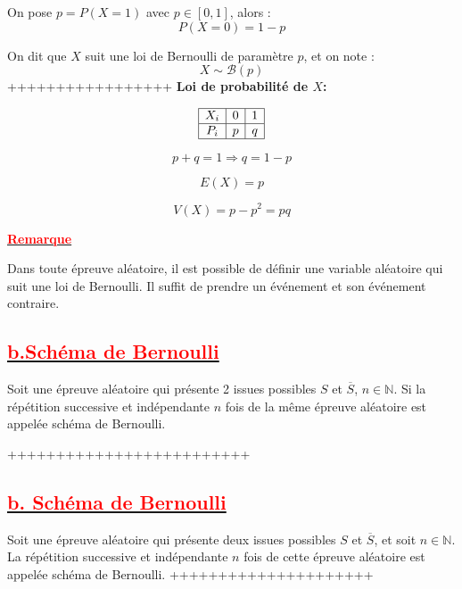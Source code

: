 \documentclass[12pt,a4paper]{article}
\begin{document}
On pose \(p = P(X = 1)\) avec \(p \in [0,1]\), alors :
\[
P(X = 0) = 1 - p
\]

On dit que \(X\) suit une loi de Bernoulli de paramètre \(p\), et on note :
\[
X \sim \mathcal{B}(p)
\]
+++++++++++++++++
\textbf{Loi de probabilité de \( X \):}

\[
\begin{array}{|c|c|c|}
\hline
X_i & 0 & 1 \\
\hline
P_i & p & q \\
\hline
\end{array}
\]

\[
p + q = 1 \Rightarrow q = 1 - p
\]

\[
E(X) = p
\]

\[
V(X) = p - p^2 = p q
\]

\underline{\textbf{\textcolor{red}{Remarque}}}

Dans toute épreuve aléatoire, il est possible de définir une variable aléatoire qui suit une loi de Bernoulli. Il suffit de prendre un événement et son événement contraire.

\subsection*{\underline{\textbf{\textcolor{red}{b.Schéma de Bernoulli}}}}

Soit une épreuve aléatoire qui présente 2 issues possibles \( S \) et \( \overline{S} \), \( n \in \mathbb{N} \). Si la répétition successive et indépendante \( n \) fois de la même épreuve aléatoire est appelée schéma de Bernoulli.

+++++++++++++++++++++++++
\subsection*{\underline{\textbf{\textcolor{red}{b. Schéma de Bernoulli}}}}

Soit une épreuve aléatoire qui présente deux issues possibles \( S \) et \( \overline{S} \), et soit \( n \in \mathbb{N} \). 
La répétition successive et indépendante \( n \) fois de cette épreuve aléatoire est appelée schéma de Bernoulli.
+++++++++++++++++++++
\end{document}
